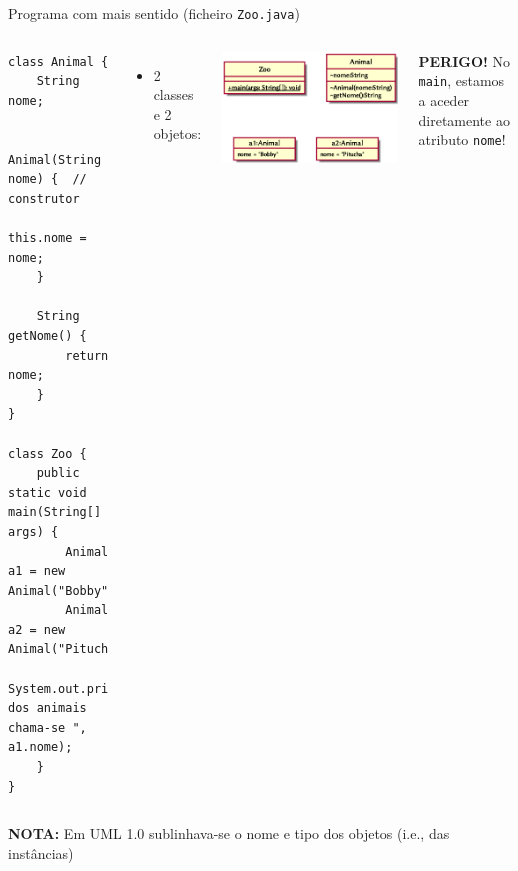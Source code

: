 \documentclass[portuguese, aspectratio=169, xcolor=table]{beamer}
\begin{document}
\begin{frame}[fragile]{Programa com mais sentido (ficheiro \texttt{Zoo.java})}
\begin{columns}
\begin{verbatim}
class Animal {
    String nome;
    
    Animal(String nome) {  // construtor
        this.nome = nome;
    }
    
    String getNome() {
        return nome;
    }
}

class Zoo {
    public static void main(String[] args) {
        Animal a1 = new Animal("Bobby");
        Animal a2 = new Animal("Pitucha");
        System.out.println("Um dos animais chama-se ", a1.nome);
    }
}
\end{verbatim}
\begin{itemize}
    \item 2 classes e 2 objetos:
\end{itemize}
    \begin{center}
        \includegraphics[width=0.6\linewidth]{./uml_diagrams/class3}
    \end{center}
\textbf{\color{red}PERIGO!} No \texttt{main}, estamos a aceder diretamente ao atributo \texttt{nome}!
\end{columns}
\vspace{-0.2cm}
\begin{flushright}
\tiny    \textbf{NOTA:} Em UML 1.0 sublinhava-se o nome e tipo dos objetos (i.e., das instâncias)
\end{flushright}
\end{frame}  
\end{document}
